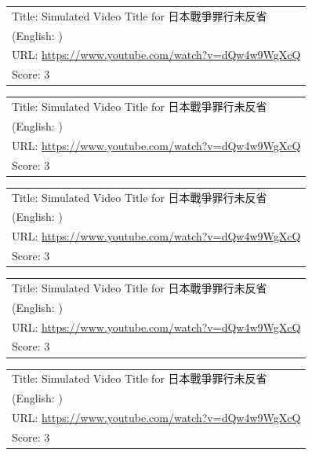 \documentclass{article}
\begin{document}
\noindent
\begin{tabular}{p{}}
Title: Simulated Video Title for 日本戰爭罪行未反省 \\
(English: ) \\
URL: \url{https://www.youtube.com/watch?v=dQw4w9WgXcQ} \\
Score: 3 \\
\end{tabular}
\vspace{0.5em}

\noindent
\begin{tabular}{p{}}
Title: Simulated Video Title for 日本戰爭罪行未反省 \\
(English: ) \\
URL: \url{https://www.youtube.com/watch?v=dQw4w9WgXcQ} \\
Score: 3 \\
\end{tabular}
\vspace{0.5em}

\noindent
\begin{tabular}{p{}}
Title: Simulated Video Title for 日本戰爭罪行未反省 \\
(English: ) \\
URL: \url{https://www.youtube.com/watch?v=dQw4w9WgXcQ} \\
Score: 3 \\
\end{tabular}
\vspace{0.5em}

\noindent
\begin{tabular}{p{}}
Title: Simulated Video Title for 日本戰爭罪行未反省 \\
(English: ) \\
URL: \url{https://www.youtube.com/watch?v=dQw4w9WgXcQ} \\
Score: 3 \\
\end{tabular}
\vspace{0.5em}

\noindent
\begin{tabular}{p{}}
Title: Simulated Video Title for 日本戰爭罪行未反省 \\
(English: ) \\
URL: \url{https://www.youtube.com/watch?v=dQw4w9WgXcQ} \\
Score: 3 \\
\end{tabular}
\vspace{0.5em}
\end{document}

